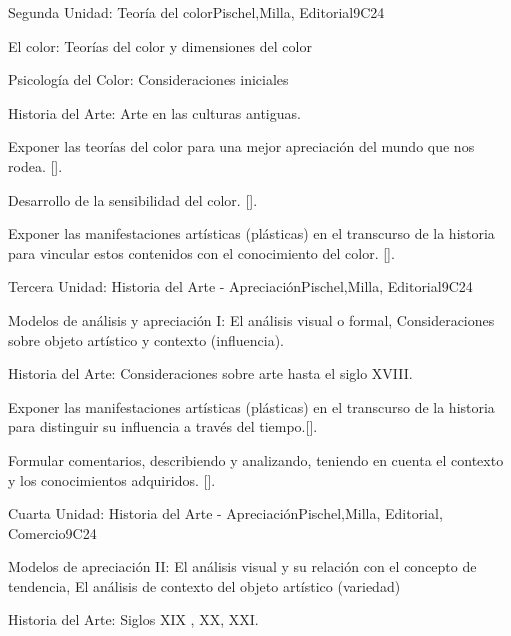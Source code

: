 \begin{syllabus}
\begin{unit}{}{Segunda Unidad: Teoría del color}{Pischel,Milla, Editorial}{9}{C24}
\begin{topics}
	\item El color: Teorías del color y dimensiones del color
	\item Psicología del Color: Consideraciones iniciales
	\item Historia del Arte: Arte en las culturas antiguas.
\end{topics}
\begin{learningoutcomes}
	\item Exponer las teorías del color para una mejor apreciación del mundo que nos rodea. [\Usage].
	\item Desarrollo de la sensibilidad del color. [\Usage].
	\item Exponer las manifestaciones  artísticas (plásticas) en el transcurso de la historia para vincular estos contenidos con el conocimiento del color.
 [\Usage].
\end{learningoutcomes}
\end{unit}

\begin{unit}{}{Tercera Unidad: Historia del Arte - Apreciación}{Pischel,Milla, Editorial}{9}{C24}
\begin{topics}
	\item Modelos de análisis y apreciación I: El análisis visual o formal, Consideraciones sobre objeto artístico y contexto (influencia).
	\item Historia del Arte: Consideraciones sobre arte hasta el siglo  XVIII.
\end{topics}
\begin{learningoutcomes}
	\item Exponer las manifestaciones  artísticas (plásticas) en el transcurso de la historia para distinguir su influencia a través del tiempo.[\Usage].
	\item Formular comentarios, describiendo y analizando, teniendo en cuenta el contexto y los conocimientos adquiridos. [\Usage].
\end{learningoutcomes}
\end{unit}

\begin{unit}{}{Cuarta Unidad: Historia del Arte - Apreciación}{Pischel,Milla, Editorial, Comercio}{9}{C24}
\begin{topics}
	\item Modelos de apreciación II: El análisis visual y su relación con el concepto de tendencia,  El análisis de contexto del objeto artístico (variedad)
	\item Historia del Arte: Siglos  XIX , XX, XXI.
\end{topics}


\end{unit}
\end{syllabus}
